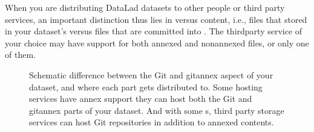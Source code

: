 \sphinxAtStartPar
When you are distributing DataLad datasets to other people or third party services,
an important distinction thus lies in  versus  content, i.e.,
files that stored in your dataset’s {\hyperref[\detokenize{glossary:term-annex}]{}} versus files that are committed
into {\hyperref[\detokenize{glossary:term-Git}]{}}.
The third\sphinxhyphen{}party service of your choice may have support for both annexed and non\sphinxhyphen{}annexed files, or only one of them.

\begin{figure}[tbp]
\centering
\capstart

\noindent{}
\caption{Schematic difference between the Git and git\sphinxhyphen{}annex aspect of your dataset, and where each part  gets distributed to.
Some hosting services have annex support \sphinxhyphen{} they can host both the Git and git\sphinxhyphen{}annex parts of your dataset. And with some {\hyperref[\detokenize{glossary:term-DataLad-extension}]{}}s, third party storage services can host Git repositories in addition to annexed contents.}\label{\detokenize{basics/101-138-sharethirdparty:id6}}\label{\detokenize{basics/101-138-sharethirdparty:fig-publishing}}\end{figure}


